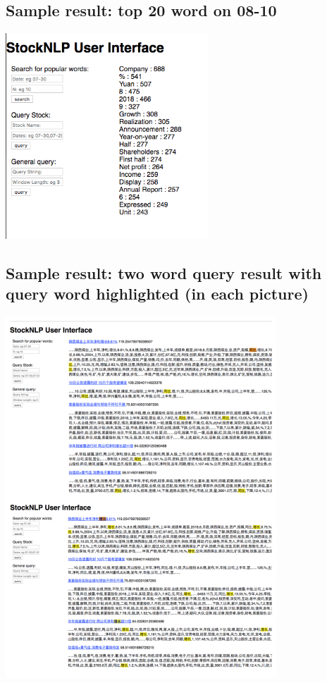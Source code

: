 \documentclass{article}
\begin{document}
\subsection{Sample result: top 20 word on 08-10}
\includegraphics[width=3in]{08-09-top20-words-en} 
\subsection{Sample result: two word query result with query word highlighted (in each picture)}
\includegraphics[width=4in]{query-with-heighlight}
\end{document}
